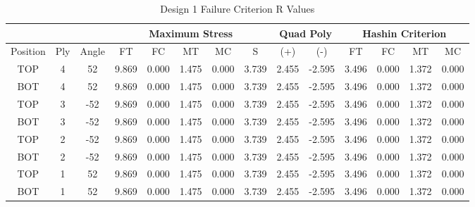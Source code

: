 \begin{landscape}
\begin{table}
\centering
\caption{Design 1 Failure Criterion R Values}
\label{tab:q1r}
\begin{tabular}{|ccc|ccccc|cc|cccc|}
\toprule
 & & & \multicolumn{5}{|c|}{Maximum Stress} & \multicolumn{2}{|c|}{Quad Poly} & \multicolumn{4}{|c|}{Hashin Criterion} \\
\midrule
Position & Ply & Angle & FT & FC & MT & MC & S & (+) & (-) & FT & FC & MT & MC \\
\midrule
TOP & 4 &  52 &   9.869 &   0.000 &   1.475 &   0.000 &  3.739 & 2.455 & -2.595 &    3.496 &    0.000 &    1.372 &    0.000 \\
BOT & 4 &  52 &   9.869 &   0.000 &   1.475 &   0.000 &  3.739 & 2.455 & -2.595 &    3.496 &    0.000 &    1.372 &    0.000 \\
TOP & 3 & -52 &   9.869 &   0.000 &   1.475 &   0.000 &  3.739 & 2.455 & -2.595 &    3.496 &    0.000 &    1.372 &    0.000 \\
BOT & 3 & -52 &   9.869 &   0.000 &   1.475 &   0.000 &  3.739 & 2.455 & -2.595 &    3.496 &    0.000 &    1.372 &    0.000 \\
TOP & 2 & -52 &   9.869 &   0.000 &   1.475 &   0.000 &  3.739 & 2.455 & -2.595 &    3.496 &    0.000 &    1.372 &    0.000 \\
BOT & 2 & -52 &   9.869 &   0.000 &   1.475 &   0.000 &  3.739 & 2.455 & -2.595 &    3.496 &    0.000 &    1.372 &    0.000 \\
TOP & 1 &  52 &   9.869 &   0.000 &   1.475 &   0.000 &  3.739 & 2.455 & -2.595 &    3.496 &    0.000 &    1.372 &    0.000 \\
BOT & 1 &  52 &   9.869 &   0.000 &   1.475 &   0.000 &  3.739 & 2.455 & -2.595 &    3.496 &    0.000 &    1.372 &    0.000 \\
\bottomrule
\end{tabular}
\end{table}
\end{landscape}